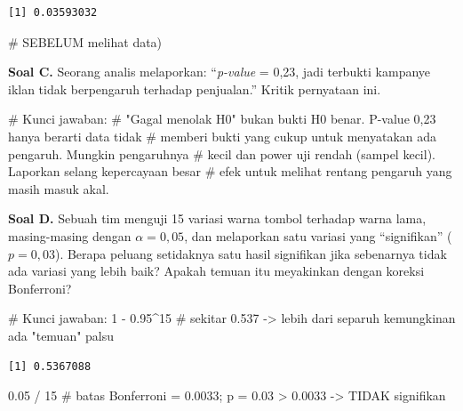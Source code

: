 \documentclass[
  indonesian,
  letterpaper,
]{book}
\newenvironment{Shaded}{\begin{snugshade}}{\end{snugshade}}
\newcommand{\CommentTok}[1]{\textcolor[rgb]{0.37,0.37,0.37}{#1}}
\newcommand{\DecValTok}[1]{\textcolor[rgb]{0.68,0.00,0.00}{#1}}
\newcommand{\FloatTok}[1]{\textcolor[rgb]{0.68,0.00,0.00}{#1}}
\newcommand{\SpecialCharTok}[1]{\textcolor[rgb]{0.37,0.37,0.37}{#1}}
\begin{document}
\begin{verbatim}
[1] 0.03593032
\end{verbatim}

\begin{Shaded}
\begin{Highlighting}[]
                       \CommentTok{\# SEBELUM melihat data)}
\end{Highlighting}
\end{Shaded}

\textbf{Soal C.} Seorang analis melaporkan: ``\emph{p-value} = 0,23,
jadi terbukti kampanye iklan tidak berpengaruh terhadap penjualan.''
Kritik pernyataan ini.

\begin{Shaded}
\begin{Highlighting}[]
\CommentTok{\# Kunci jawaban:}
\CommentTok{\# "Gagal menolak H0" bukan bukti H0 benar. P{-}value 0,23 hanya berarti data tidak}
\CommentTok{\# memberi bukti yang cukup untuk menyatakan ada pengaruh. Mungkin pengaruhnya}
\CommentTok{\# kecil dan power uji rendah (sampel kecil). Laporkan selang kepercayaan besar}
\CommentTok{\# efek untuk melihat rentang pengaruh yang masih masuk akal.}
\end{Highlighting}
\end{Shaded}

\textbf{Soal D.} Sebuah tim menguji 15 variasi warna tombol terhadap
warna lama, masing-masing dengan \(\alpha = 0{,}05\), dan melaporkan
satu variasi yang ``signifikan'' (\(p = 0{,}03\)). Berapa peluang
setidaknya satu hasil signifikan jika sebenarnya tidak ada variasi yang
lebih baik? Apakah temuan itu meyakinkan dengan koreksi Bonferroni?

\begin{Shaded}
\begin{Highlighting}[]
\CommentTok{\# Kunci jawaban:}
\DecValTok{1} \SpecialCharTok{{-}} \FloatTok{0.95}\SpecialCharTok{\^{}}\DecValTok{15}  \CommentTok{\# sekitar 0.537 {-}\textgreater{} lebih dari separuh kemungkinan ada "temuan" palsu}
\end{Highlighting}
\end{Shaded}

\begin{verbatim}
[1] 0.5367088
\end{verbatim}

\begin{Shaded}
\begin{Highlighting}[]
\FloatTok{0.05} \SpecialCharTok{/} \DecValTok{15}    \CommentTok{\# batas Bonferroni = 0.0033; p = 0.03 \textgreater{} 0.0033 {-}\textgreater{} TIDAK signifikan}
\end{Highlighting}
\end{Shaded}
\end{document}
